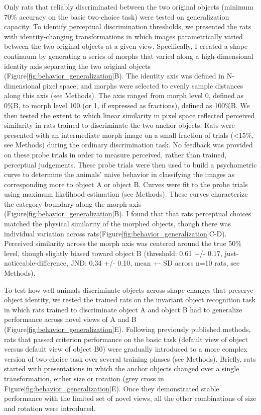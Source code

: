 Only rats that reliably discriminated between the two original objects (minimum 70\% accuracy on the basic two-choice task) were tested on generalization capacity. To identify perceptual discrimination thresholds, we presented the rats with identity-changing transformations in which images parametrically varied between the two original objects at a given view. Specifically, I created a shape continuum by generating a series of morphs that varied along a high-dimensional identity axis separating the two original objects (Figure\ref{fig:behavior_generalization}B). The identity axis was defined in N-dimensional pixel space, and morphs were selected to evenly sample distances along this axis (see Methods). The axis ranged from morph level 0, defined as 0\%B, to morph level 100 (or 1, if expressed as fractions), defined as 100\%B. We then tested the extent to which linear similarity in pixel space reflected perceived similarity in rats trained to discriminate the two anchor objects. 
Rats were presented with an intermediate morph image on a small fraction of trials (<15\%, see Methods) during the ordinary discrimination task. No feedback was provided on these probe trials in order to measure perceived, rather than trained, perceptual judgements. These probe trials were then used to build a psychometric curve to determine the animals' naive behavior in classifying the images as corresponding more to object A or object B. Curves were fit to the probe trials using maximum likelihood estimation (see Methods). These curves characterize the category boundary along the morph axis (Figure\ref{fig:behavior_generalization}B). I found that that rats perceptual choices matched the physical similarity of the morphed objects, though there was individual variation across  rats(Figure\ref{fig:behavior_generalization}C-D). Perceived similarity across the morph axis was centered around the true 50\% level, though slightly biased toward object B (threshold: 0.61 +/- 0.17, just-noticeable-difference, JND: 0.34 +/- 0.10, mean +- SD across n=10 rats, see Methods). 

To test how well animals discriminate objects across shape changes that preserve object identity, we tested the trained rats on the invariant object recognition task in which rats trained to discriminate object A and object B had to generalize performance across novel views of A and B (Figure\ref{fig:behavior_generalization}E). Following previously published methods, rats that passed criterion performance on the basic task (default view of object versus default view of object B0) were gradually introduced to a more complex version of two-choice task over several training phases (see Methods). Briefly, rats started with presentations in which the anchor objects changed over a single transformation, either size or rotation (grey cross in Figure\ref{fig:behavior_generalization}E). Once they demonstrated stable performance with the limited set of novel views, all the other combinations of size and rotation were introduced. 

